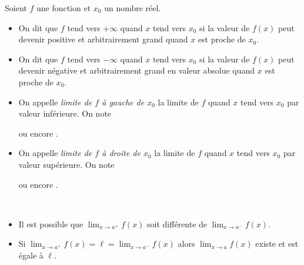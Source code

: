       \begin{defi}[Limites en $x_0$]
            Soient $f$ une fonction et $x_0$ un nombre r\'eel.
            \begin{itemize}
                  \item On dit que $f$ tend vers $+\infty$ quand $x$ tend vers $x_0$ si 
                        la valeur de $f(x)$ peut devenir positive et arbitrairement grand
                        quand $x$ est proche de $x_0$.
                  \item On dit que $f$ tend vers $-\infty$ quand $x$ tend vers $x_0$ si 
                        la valeur de $f(x)$ peut devenir n\'egative et arbitrairement grand en valeur absolue
                        quand $x$ est proche de $x_0$.
                  \item On appelle \emph{limite de $f$ \`a gauche de $x_0$} 
                        la limite de $f$ quand $x$ tend vers ${x_0}$ par valeur inf\'erieure.
                        On note 
                        \begin{center}
                              ou encore .
                        \end{center}
                  \item On appelle \emph{limite de $f$ \`a droite de ${x_0}$} 
                        la limite de $f$ quand $x$ tend vers ${x_0}$ par valeur sup\'erieure.
                        On note 
                        \begin{center}
                              ou encore .
                        \end{center}
            \end{itemize}
%
      \begin{rmk}~\\[-1\baselineskip]
            \begin{itemize}
            \item Il est possible que $\lim_{x\rightarrow a^+} f(x)$ soit diff\'erente de $\lim_{x\rightarrow a^-} f(x)$.
            \item Si $\lim_{x\rightarrow a^+} f(x) = \ell = \lim_{x\rightarrow a^-} f(x)$ 
                  alors $\lim_{x\rightarrow a} f(x)$ existe et est \'egale \`a $\ell$.
            \end{itemize}
      \end{rmk}
      \end{defi}
